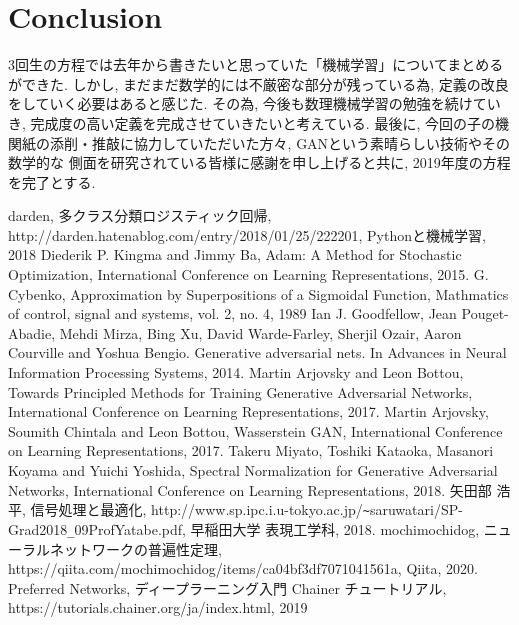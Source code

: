 \documentclass[11pt, a4paper, dvipdfmx]{jsarticle}
\theoremstyle{definition}
\begin{document}
\section{Conclusion}
3回生の方程では去年から書きたいと思っていた「機械学習」についてまとめるができた. 
しかし, まだまだ数学的には不厳密な部分が残っている為, 定義の改良をしていく必要はあると感じた. 
その為, 今後も数理機械学習の勉強を続けていき, 完成度の高い定義を完成させていきたいと考えている. 
最後に, 今回の子の機関紙の添削・推敲に協力していただいた方々, GANという素晴らしい技術やその数学的な
側面を研究されている皆様に感謝を申し上げると共に, 2019年度の方程を完了とする. 
\begin{thebibliography}{20}
     darden, 多クラス分類ロジスティック回帰, \\
    http://darden.hatenablog.com/entry/2018/01/25/222201, Pythonと機械学習, 2018
     Diederik P. Kingma and Jimmy Ba, Adam: A Method for Stochastic Optimization, 
    International Conference on Learning Representations, 2015.
     G. Cybenko, Approximation by Superpositions of a Sigmoidal Function, Mathmatics of control, signal and systems, vol. 2, no. 4, 1989
     Ian J. Goodfellow, Jean Pouget-Abadie, Mehdi Mirza, Bing Xu, David Warde-Farley, Sherjil Ozair, Aaron Courville and Yoshua Bengio. 
    Generative adversarial nets. In Advances in Neural Information Processing Systems, 2014.
    Martin Arjovsky and Leon Bottou, Towards Principled Methods for Training Generative Adversarial Networks,
    International Conference on Learning Representations, 2017.
     Martin Arjovsky, Soumith Chintala and Leon Bottou, Wasserstein GAN, 
    International Conference on Learning Representations, 2017.
    Takeru Miyato, Toshiki Kataoka, Masanori Koyama and Yuichi Yoshida, Spectral Normalization for Generative Adversarial Networks, 
    International Conference on Learning Representations, 2018.
     矢田部 浩平, 信号処理と最適化, http://www.sp.ipc.i.u-tokyo.ac.jp/\verb|~|saruwatari/SP-Grad2018\verb|_|09ProfYatabe.pdf, 早稲田大学 表現工学科, 2018.
     mochimochidog, ニューラルネットワークの普遍性定理, \\
    https://qiita.com/mochimochidog/items/ca04bf3df7071041561a, Qiita, 2020.
    \bibitem{} Preferred Networks, ディープラーニング入門 Chainer チュートリアル,\\
    https://tutorials.chainer.org/ja/index.html, 2019
\end{thebibliography}
\end{document}
